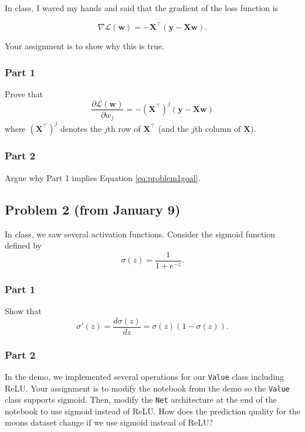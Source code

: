 \documentclass{article}
\begin{document}
In class, I waved my hands and said that the gradient of the
loss function is

\begin{equation}\label{eq:problem1goal}
 \nabla \mathcal{L}(\mathbf{w}) = - \mathbf{X}^\top
(\mathbf{y} - \mathbf{X} \mathbf{w}).   
\end{equation}

Your assignment is to show why this is true.

\subsubsection*{Part 1}
Prove that
\begin{equation*}
 \frac{\partial \mathcal{L}(\mathbf{w})}{\partial w_j}
= - (\mathbf{X}^\top)^j (\mathbf{y} - \mathbf{X w})
\end{equation*}
where $(\mathbf{X}^\top)^j$ denotes the $j$th row 
of $\mathbf{X}^\top$ (and the $j$th column of $\mathbf{X}$).

\subsubsection*{Part 2}
Argue why Part 1 implies 
Equation \ref{eq:problem1goal}.

%

\subsection*{Problem 2 (from January 9)}
In class, we saw several activation functions.
Consider the sigmoid function defined by
\begin{equation*}
\sigma(z) = \frac{1}{1+e^{-z}}.
\end{equation*}

\subsubsection*{Part 1}
Show that 
\begin{equation*}
    \sigma'(z) = \frac{d \sigma(z)}{dz} 
    = \sigma(z) (1-\sigma(z)).
\end{equation*}

\subsubsection*{Part 2}
In the demo, we implemented several operations
for our \texttt{Value} class including ReLU.
Your assignment is to modify the notebook from
the demo so the \texttt{Value} class supports sigmoid.
Then, modify the \texttt{Net}
architecture at the end of the
notebook to use sigmoid instead of ReLU.
How does the prediction quality for the moons dataset
change if we use sigmoid instead of ReLU?
\end{document}
